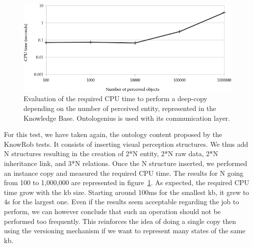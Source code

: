 \begin{figure}[ht!]
\centering
\includegraphics[width=\textwidth]{figures/chapter2/extra_tests/deepcopy.png}
\caption{\label{fig:chap2_extra_deepcopy} Evaluation of the required CPU time to perform a deep-copy depending on the number of perceived entity, represented in the Knowledge Base. Ontologenius is used with its communication layer. }
\end{figure}

For this test, we have taken again, the ontology content proposed by the KnowRob tests. It consists of inserting visual perception structures. We thus add N structures resulting in the creation of 2*N entity, 2*N raw data, 2*N inheritance link, and 3*N relations. Once the N structure inserted, we performed an instance copy and measured the required CPU time. The results for N going from 100 to 1,000,000 are represented in figure~\ref{fig:chap2_extra_deepcopy}. As expected, the required CPU time grow with the \acrshort{kb} size. Starting around 100ms for the smallest \acrshort{kb}, it grew to 4s for the largest one. Even if the results seem acceptable regarding the job to perform, we can however conclude that such an operation should not be performed too frequently. This reinforces the idea of doing a single copy then using the versioning mechanism if we want to represent many states of the same \acrshort{kb}.
